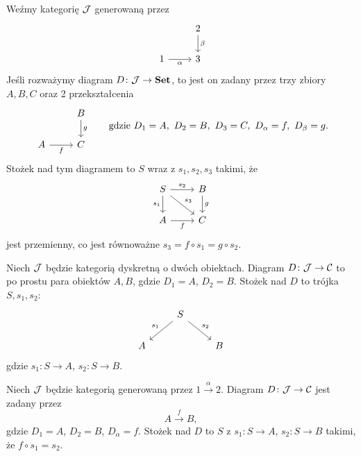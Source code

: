 \begin{przyklad}
Weźmy kategorię $\mathcal{J}$ generowaną przez
\[
\begin{tikzcd}
& 2 \arrow[d,"\beta"] \\
1 \arrow[r,"\alpha"'] & 3
\end{tikzcd}
\]
Jeśli rozważymy diagram $D\colon \mathcal{J}\to \mathbf{Set}$, to jest on zadany przez trzy zbiory $A,B,C$ oraz 2 przekształcenia
\[
\begin{tikzcd}
& B \arrow[d,"g"] \\
A \arrow[r,"f"'] & C
\end{tikzcd}
\qquad
\text{gdzie } D_1=A,\ D_2=B,\ D_3=C,\ D_\alpha = f,\ D_\beta = g.
\]
Stożek nad tym diagramem to $S$ wraz z $s_1, s_2, s_3$ takimi, że
\[
\begin{tikzcd}
S \arrow[r,"s_2"] \arrow[d,"s_1"'] \arrow[dr,"s_3"] & B \arrow[d,"g"] \\
A \arrow[r,"f"'] & C
\end{tikzcd}
\]
jest przemienny, co jest równoważne $s_3 = f\circ s_1 = g\circ s_2$.
\end{przyklad}

\begin{przyklad}
Niech $\mathcal{J}$ będzie kategorią dyskretną o dwóch obiektach. Diagram $D\colon \mathcal{J}\to \mathcal{C}$ to po prostu para obiektów $A,B$, gdzie $D_1=A$, $D_2=B$. Stożek nad $D$ to trójka $S, s_1, s_2$:
\[
\begin{tikzcd}
& S \arrow[dl,"s_1"'] \arrow[dr,"s_2"] & \\
A & & B
\end{tikzcd}
\]
gdzie $s_1\colon S\to A$, $s_2\colon S\to B$.
\end{przyklad}

\begin{przyklad}
Niech $\mathcal{J}$ będzie kategorią generowaną przez $1 \xrightarrow{\alpha} 2$. Diagram $D\colon \mathcal{J}\to \mathcal{C}$ jest zadany przez
\[
A \xrightarrow{f} B,
\]
gdzie $D_1=A$, $D_2=B$, $D_\alpha = f$. Stożek nad $D$ to $S$ z $s_1\colon S\to A$, $s_2\colon S\to B$ takimi, że $f\circ s_1 = s_2$.
\end{przyklad}
